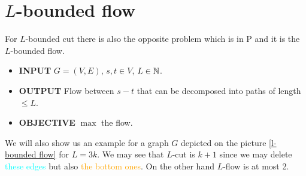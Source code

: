 \section{$L$-bounded flow}

For $L$-bounded cut there is also the opposite problem which is in P and it is the $L$-bounded flow.

\begin{itemize}[]
	\item \textbf{INPUT} $G = (V,E)$, $s,t \in V$, $L \in \mathbb{N}$.
	\item \textbf{OUTPUT} Flow between $s-t$ that can be decomposed into paths of length $\leq L$.
	\item \textbf{OBJECTIVE} $\max$ the flow.
\end{itemize}

We will also show us an example for a graph $G$ depicted on the picture \ref{l-bounded flow} for $L = 3k$. We may see that $L$-cut is $k+1$ since we may delete \textcolor{cyan}{these edges} but also \textcolor{orange}{the bottom ones}. On the other hand $L$-flow is at most 2.

